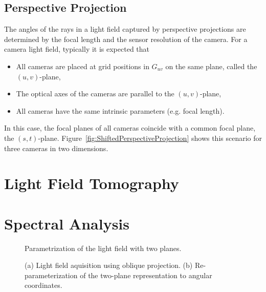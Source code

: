 \subsection*{Perspective Projection}
% 
The angles of the rays in a light field captured by perspective projections are determined by the focal length and the sensor resolution of the camera.
For a camera light field, typically it is expected that
\begin{itemize}
	\item All cameras are placed at grid positions in $G_{uv}$ on the same plane, called the $(u, v)$-plane, 
	\item The optical axes of the cameras are parallel to the $(u, v)$-plane, 
	\item All cameras have the same intrinsic parameters (e.g. focal length).
\end{itemize}
In this case, the focal planes of all cameras coincide with a common focal plane, the $(s, t)$-plane.
Figure~\ref{fig:ShiftedPerspectiveProjection} shows this scenario for three cameras in two dimensions.



\section{Light Field Tomography}
%

\section{Spectral Analysis}



\begin{figure}
	\centering
	
	\caption{Parametrization of the light field with two planes.}
	\label{fig:LightFieldParametrization}
\end{figure}

\begin{figure}
	\subfigure[]{
		\centering
		
		\label{fig:ObliqueProjection}
	}
	\hfill
	\subfigure[]{
		\centering
		
		\label{fig:ObliqueProjectionReparameterization}
	}
	\caption{(a) Light field aquisition using oblique projection. (b) Re-parameterization of the two-plane representation to angular coordinates.}
\end{figure}

